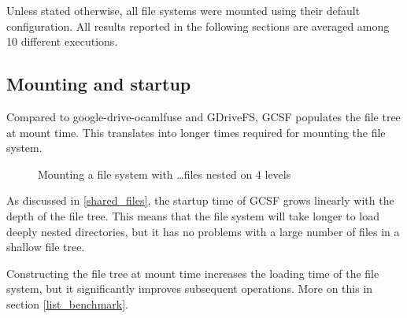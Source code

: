 Unless stated otherwise, all file systems were mounted using their default configuration. All results reported in the following sections are averaged among 10 different executions.

\subsection{Mounting and startup}

Compared to google-drive-ocamlfuse and GDriveFS, GCSF populates the file tree at mount time. This translates into longer times required for mounting the file system.

\mountingtimes

\begin{figure}
\centering
{}
\caption{Mounting a file system with \ldots files nested on 4 levels} \label{fig:M1}
\end{figure} 

As discussed in \ref{shared_files}, the startup time of GCSF grows linearly with the depth of the file tree. This means that the file system will take longer to load deeply nested directories, but it has no problems with a large number of files in a shallow file tree.

Constructing the file tree at mount time increases the loading time of the file system, but it significantly improves subsequent operations. More on this in section \ref{list_benchmark}.

